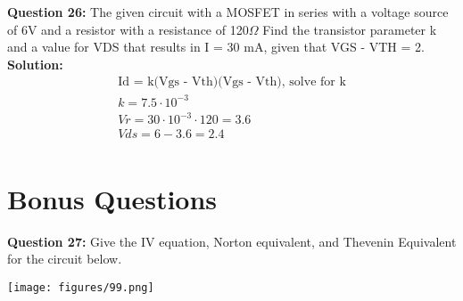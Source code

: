 \documentclass{article}
\begin{document}
\textbf{Question 26:} The given circuit with a MOSFET in series with a voltage source of 6V and a resistor with a resistance of 120\(\Omega\)
Find the transistor parameter k and a value for VDS that results in I = 30 mA, given that VGS - VTH = 2.
\textbf{Solution:}
\begin{align*}
   \text{Id = k(Vgs - Vth)(Vgs - Vth), solve for k}\\
   \boxed{k = 7.5 \cdot 10^{-3}}\\
   Vr = 30 \cdot 10^{-3} \cdot 120 = 3.6\\
   Vds = 6 - 3.6 = \boxed{2.4}\\ 
\end{align*}
 

\section*{Bonus Questions}

\textbf{Question 27:} Give the IV equation, Norton equivalent, and Thevenin Equivalent for the circuit below.

\begin{center}

    \texttt{[image: figures/99.png]}
\end{center}
\end{document}
